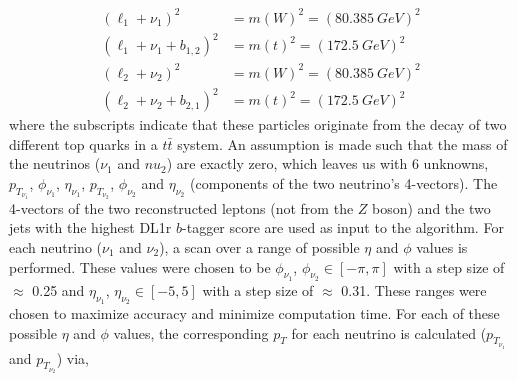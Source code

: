 \begin{align}
    (\ell_{1} + \nu_{1})^{2} &= m(W)^{2} = (\SI{80.385}{GeV})^2\\
    (\ell_{1} + \nu_{1} + b_{1,2})^{2} &= m(t)^{2} = (\SI{172.5}{GeV})^{2}\\
    (\ell_{2} + \nu_{2})^{2} &= m(W)^{2} = (\SI{80.385}{GeV})^2\\
       (\ell_{2} + \nu_{2} + b_{2,1})^{2} &= m(t)^{2} = (\SI{172.5}{GeV})^{2}
\end{align}where the subscripts indicate that these particles originate from the decay of two different top quarks in a $t\bar{t}$ system. An assumption is made such that the mass of the neutrinos ($\nu_{1}$ and $nu_{2}$) are exactly zero, which leaves us with 6 unknowns, $p_{{T}_{\nu_{1}}}$, $\phi_{\nu_{1}}$, $\eta_{\nu_{1}}$, $p_{{T}_{\nu_{2}}}$, $\phi_{\nu_{2}}$ and $\eta_{\nu_{2}}$ (components of the two neutrino's 4-vectors). The 4-vectors of the two reconstructed leptons (not from the $Z$ boson) and the two jets with the highest DL1r $b$-tagger score are used as input to the algorithm. For each neutrino ($\nu_{1}$ and $\nu_{2}$), a scan over a range of possible $\eta$ and $\phi$ values is performed. These values were chosen to be $\phi_{\nu_{1}}$, $\phi_{\nu_{2}} \in [-\pi,\pi]$ with a step size of $\approx$ 0.25 and $\eta_{\nu_{1}}$, $\eta_{\nu_{2}} \in [-5,5]$ with a step size of $\approx$ 0.31. These ranges were chosen to maximize accuracy and minimize computation time. For each of these possible $\eta$ and $\phi$ values, the corresponding $p_{T}$ for each neutrino is calculated ($p_{{T}_{\nu_{1}}}$ and $p_{{T}_{\nu_{2}}}$) via,

